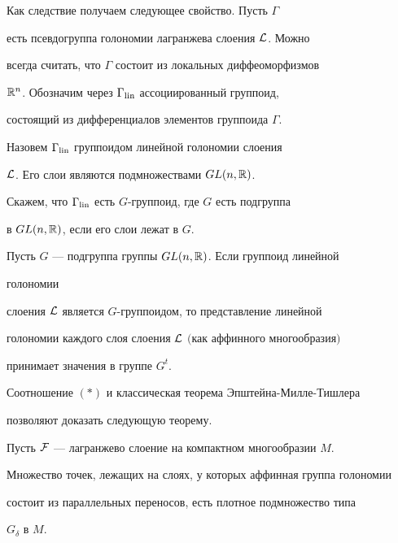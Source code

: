 Как следствие получаем следующее свойство. Пусть $\Gamma$


есть псевдогруппа голономии лагранжева слоения $\cal L$. Можно


всегда считать, что $\Gamma$ состоит из локальных диффеоморфизмов


${\Bbb R}^n$. Обозначим через $\Gamma_{\operatorname{lin}}$ ассоциированный группоид,


состоящий из дифференциалов элементов группоида $\Gamma$.


Назовем $\Gamma_{\operatorname{lin}}$ группоидом линейной голономии слоения


$\cal L$. Его слои являются подмножествами $GL(n, {\Bbb R})$.


Скажем, что $\Gamma_{\operatorname{lin}}$ есть $G$-группоид, где $G$ есть подгруппа


в $GL(n,{\Bbb R})$, если его слои лежат в $G$.





\begin{lem}


Пусть $G$ --- подгруппа группы $GL(n,{\Bbb R})$. Если группоид линейной


голономии


слоения $\cal L$ является $G$-группоидом, то представление линейной


голономии каждого слоя слоения $\cal L$ $($как аффинного многообразия$)$


принимает значения в группе $G^t$.


\end{lem}





Соотношение $(*)$ и классическая теорема Эпштейна-Милле-Тишлера


\cite{EM} позволяют доказать следующую теорему.





\begin{thm}


Пусть $\cal F$ --- лагранжево слоение на компактном многообразии $M$.


Множество точек, лежащих на слоях, у которых аффинная группа голономии


состоит из параллельных переносов, есть плотное подмножество типа


$G_{\delta}$ в $M$.


\end{thm}





